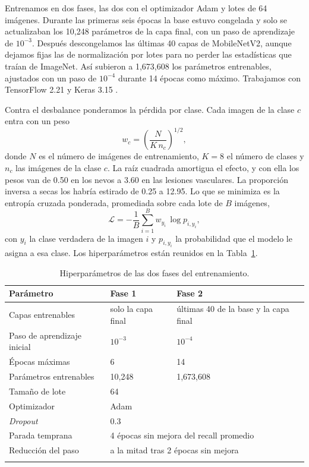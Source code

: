\documentclass[pdflatex,sn-mathphys-num]{sn-jnl}%
\theoremstyle{thmstyleone}%
\theoremstyle{thmstyletwo}%
\theoremstyle{thmstylethree}%
\begin{document}
Entrenamos en dos fases, las dos con el optimizador Adam \cite{kingma2015} y lotes de 64 imágenes. Durante las primeras seis épocas la base estuvo congelada y solo se actualizaban los 10,248 parámetros de la capa final, con un paso de aprendizaje de $10^{-3}$. Después descongelamos las últimas 40 capas de MobileNetV2, aunque dejamos fijas las de normalización por lotes \cite{ioffe2015} para no perder las estadísticas que traían de ImageNet. Así subieron a 1,673,608 los parámetros entrenables, ajustados con un paso de $10^{-4}$ durante 14 épocas como máximo. Trabajamos con TensorFlow 2.21 y Keras 3.15 \cite{abadi2016,keras}.

Contra el desbalance \cite{he2009} ponderamos la pérdida por clase. Cada imagen de la clase $c$ entra con un peso
\begin{equation}
w_c = \left(\frac{N}{K\,n_c}\right)^{1/2},\label{eq2}
\end{equation}
donde $N$ es el número de imágenes de entrenamiento, $K=8$ el número de clases y $n_c$ las imágenes de la clase $c$. La raíz cuadrada amortigua el efecto, y con ella los pesos van de 0.50 en los nevos a 3.60 en las lesiones vasculares. La proporción inversa a secas los habría estirado de 0.25 a 12.95. Lo que se minimiza es la entropía cruzada ponderada, promediada sobre cada lote de $B$ imágenes,
\begin{equation}
\mathcal{L} = -\frac{1}{B}\sum_{i=1}^{B} w_{y_i}\,\log p_{i,y_i},\label{eq3}
\end{equation}
con $y_i$ la clase verdadera de la imagen $i$ y $p_{i,y_i}$ la probabilidad que el modelo le asigna a esa clase. Los hiperparámetros están reunidos en la Tabla~\ref{tab5}.

\begin{table}[h]
\caption{Hiperparámetros de las dos fases del entrenamiento.}\label{tab5}%
\begin{tabular}{@{}lll@{}}
\toprule
Parámetro & Fase 1 & Fase 2 \\
\midrule
Capas entrenables & solo la capa final & últimas 40 de la base y la capa final \\
Paso de aprendizaje inicial & $10^{-3}$ & $10^{-4}$ \\
Épocas máximas & 6 & 14 \\
Parámetros entrenables & 10,248 & 1,673,608 \\
Tamaño de lote & \multicolumn{2}{l}{64} \\
Optimizador & \multicolumn{2}{l}{Adam} \\
\textit{Dropout} & \multicolumn{2}{l}{0.3} \\
Parada temprana & \multicolumn{2}{l}{4 épocas sin mejora del recall promedio} \\
Reducción del paso & \multicolumn{2}{l}{a la mitad tras 2 épocas sin mejora} \\
\botrule
\end{tabular}
\end{table}
\end{document}
